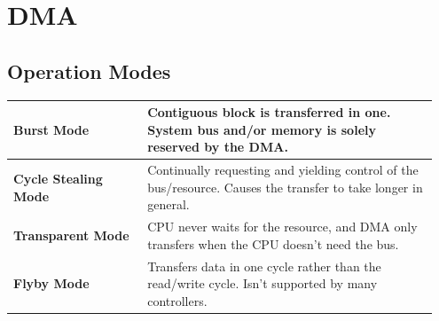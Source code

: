 \section{DMA }
	\subsection{Operation Modes}
			\begin{longtable}{|p{0.3\linewidth}|p{0.65\linewidth}|}
				\hline
				\textbf{Burst Mode}
					& Contiguous block is transferred in one. System bus and/or memory is solely reserved by the DMA.\\
				\hline
				\textbf{Cycle Stealing Mode}
					& Continually requesting and yielding control of the bus/resource. Causes the transfer to take longer in general.\\
				\hline
				\textbf{Transparent Mode}
					& CPU never waits for the resource, and DMA only transfers when the CPU doesn't need the bus.\\
				\hline	
				\textbf{Flyby Mode}
					& Transfers data in one cycle rather than the read/write cycle. Isn't supported by many controllers.\\
				\hline
			\end{longtable}
